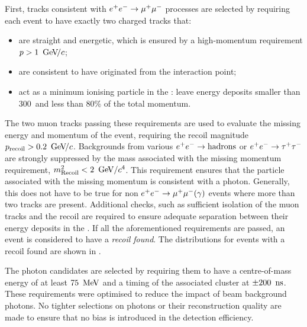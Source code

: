 First, tracks consistent with $e^+e^-\rightarrow\mu^+\mu^-$ processes are selected by requiring each event to have exactly two charged tracks that:
\begin{itemize}
    \item are straight and energetic, which is ensured by a high-momentum requirement $p>1~{\mathrm{\,Ge\kern -0.1em V\!/}c}$;
    \item are consistent to have originated from the interaction point;
    \item act as a minimum ionising particle in the \ECL: leave energy deposits smaller than 300~\mev and less than 80\% of the total momentum.
\end{itemize}
The two muon tracks passing these requirements are used to evaluate the missing energy and momentum of the event, requiring the recoil magnitude $p_{\mathrm{recoil}}>0.2~{\mathrm{\,Ge\kern -0.1em V\!/}c}$.
Backgrounds from various $e^+e^-\rightarrow\mathrm{hadrons}$ or $e^+e^-\rightarrow\tau^+\tau^-$ are strongly suppressed by the mass associated with the missing momentum requirement,
$m^2_{\mathrm{Recoil}}<2~\mathrm{\,Ge\kern -0.1em V}/c^4$.
This requirement ensures that the particle associated with the missing momentum is consistent with a photon.
Generally, this does not have to be true for non $e^+e^-\rightarrow\mu^+\mu^-(\gamma)$ events where more than two tracks are present.
Additional checks, such as sufficient isolation of the muon tracks and the recoil are required to ensure adequate separation between their energy deposits in the \ECL.
If all the aforementioned requirements are passed, an event is considered to have a \textit{recoil found}.
The distributions for events with a recoil found are shown in .

The photon candidates are selected by requiring them to have a centre-of-mass energy of at least $75~\mathrm{\,Me\kern -0.1em V}$ and a timing of the associated cluster at $\pm200~{\rm \,ns}$.
These requirements were optimised to reduce the impact of beam background photons.
No tighter selections on photons or their reconstruction quality are made to ensure that no bias is introduced in the detection efficiency.

